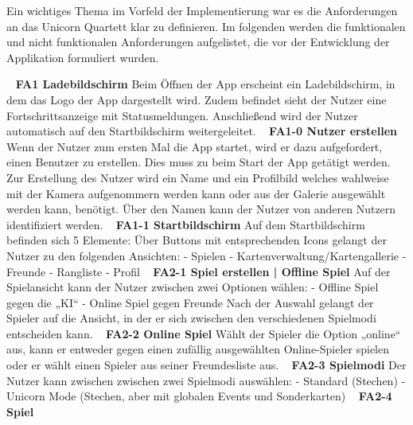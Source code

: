 \documentclass{scrartcl}
\begin{document}
Ein wichtiges Thema im Vorfeld der Implementierung war es die Anforderungen an das Unicorn Quartett klar zu definieren.
Im folgenden werden die funktionalen und nicht funktionalen Anforderungen
aufgelistet, die vor der Entwicklung der Applikation formuliert wurden. 

\ \newline
\textbf{FA1 Ladebildschirm} \newline
Beim Öffnen der App erscheint ein Ladebildschirm, in dem das Logo der App dargestellt wird. Zudem befindet sieht der Nutzer eine Fortschrittsanzeige mit Statusmeldungen. Anschließend wird der Nutzer automatisch auf den Startbildschirm weitergeleitet.
\ \newline
\textbf{FA1-0 Nutzer erstellen} \newline
Wenn der Nutzer zum ersten Mal die App startet, wird er dazu aufgefordert, einen Benutzer zu erstellen. Dies muss zu beim Start der App getätigt werden. Zur Erstellung des Nutzer wird ein Name und ein Profilbild welches wahlweise mit der Kamera aufgenommern werden kann oder aus der Galerie ausgewählt werden kann, benötigt. Über den Namen kann der Nutzer von anderen Nutzern identifiziert werden.
\ \newline
\textbf{FA1-1 Startbildschirm} \newline
Auf dem Startbildschirm befinden sich 5 Elemente: Über Buttons mit entsprechenden Icons gelangt der Nutzer zu den folgenden Ansichten:
- Spielen
- Kartenverwaltung/Kartengallerie
- Freunde
- Rangliste
- Profil
\ \newline
\textbf{FA2-1 Spiel erstellen | Offline Spiel} \newline
Auf der Spielansicht kann der Nutzer zwischen  zwei Optionen wählen:
- Offline Spiel gegen die „KI“
- Online Spiel gegen Freunde
Nach der Auswahl gelangt der Spieler auf die Ansicht, in der er sich zwischen den verschiedenen Spielmodi entscheiden kann.
\ \newline
\textbf{FA2-2 Online Spiel} \newline
Wählt der Spieler die Option „online“ aus, kann er entweder gegen einen zufällig ausgewählten Online-Spieler spielen oder er wählt einen Spieler aus seiner Freundesliste aus.
\ \newline
\textbf{FA2-3 Spielmodi} \newline
Der Nutzer kann zwischen zwischen zwei Spielmodi auswählen:
- Standard (Stechen)
- Unicorn Mode (Stechen, aber mit globalen Events und Sonderkarten)
\ \newline
\textbf{FA2-4 Spiel} \newline
\end{document}
